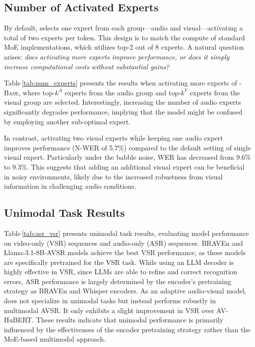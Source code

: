 


\subsection{Number of Activated Experts}

By default, \ourmodel selects one expert from each group---audio and visual---activating a total of two experts per token. This design is to match the compute of standard MoE implementations, which utilizes top-2 out of 8 experts. A natural question arises: \textit{does activating more experts improve performance, or does it simply increase computational costs without substantial gains?}

Table\,\ref{tab:num_experts} presents the results when activating more experts of \ourmodel-\textsc{Base}, where top-$k^A$ experts from the audio group and top-$k^V$ experts from the visual group are selected. Interestingly, increasing the number of audio experts significantly degrades performance, implying that the model might be confused by employing another sub-optimal expert. 


In contrast, activating two visual experts while keeping one audio expert improves performance (N-WER of 5.7\%) compared to the default setting of single visual expert. Particularly under the babble noise, WER has decreased from 9.6\% to 9.3\%. 
This suggests that adding an additional visual expert can be beneficial in noisy environments, likely due to the increased robustness from visual information in challenging audio conditions.


\subsection{Unimodal Task Results}

Table\,\ref{tab:asr_vsr} presents unimodal task results, evaluating model performance on video-only (VSR) sequences and audio-only (ASR) sequences. 
BRAVEn \cite{haliassos2024braven} and Llama-3.1-8B-AVSR \cite{cappellazzo2024large} models achieve the best VSR performance, as these models are specifically pretrained for the VSR task. While using an LLM decoder is highly effective in VSR, since LLMs are able to refine and correct recognition errors, ASR performance is largely determined by the encoder's pretraining strategy as BRAVEn and Whisper encoders.
As an adaptive audio-visual model, \ourmodel does not specialize in unimodal tasks but instead performs robustly in multimodal AVSR. It only exhibits a slight improvement in VSR over AV-HuBERT. These results indicate that unimodal performance is primarily influenced by the effectiveness of the encoder pretraining strategy rather than the MoE-based multimodal approach.

